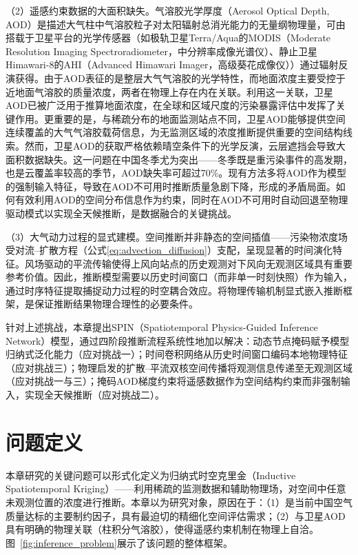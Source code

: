 （2）遥感约束数据的大面积缺失。气溶胶光学厚度（Aerosol Optical Depth, AOD）是描述大气柱中气溶胶粒子对太阳辐射总消光能力的无量纲物理量，可由搭载于卫星平台的光学传感器（如极轨卫星Terra/Aqua的MODIS（Moderate Resolution Imaging Spectroradiometer，中分辨率成像光谱仪）、静止卫星Himawari-8的AHI（Advanced Himawari Imager，高级葵花成像仪））通过辐射反演获得\citep{bessho2016introduction}。由于AOD表征的是整层大气气溶胶的光学特性，而地面\PM 浓度主要受控于近地面气溶胶的质量浓度，两者在物理上存在内在关联\citep{van2016global}。利用这一关联，卫星AOD已被广泛用于推算地面\PM 浓度，在全球和区域尺度的污染暴露评估中发挥了关键作用\citep{geng2021tracking,xiao2017full}。更重要的是，与稀疏分布的地面监测站点不同，卫星AOD能够提供空间连续覆盖的大气气溶胶载荷信息，为无监测区域的\PM 浓度推断提供重要的空间结构线索。然而，卫星AOD的获取严格依赖晴空条件下的光学反演，云层遮挡会导致大面积数据缺失\citep{just2020gradient}。这一问题在中国冬季尤为突出——冬季既是重污染事件的高发期，也是云覆盖率较高的季节，AOD缺失率可超过70\%。现有方法多将AOD作为模型的强制输入特征，导致在AOD不可用时推断质量急剧下降，形成的矛盾局面。如何有效利用AOD的空间分布信息作为约束，同时在AOD不可用时自动回退至物理驱动模式以实现全天候推断，是数据融合的关键挑战。

（3）大气动力过程的显式建模。空间推断并非静态的空间插值——污染物浓度场受对流--扩散方程（公式\eqref{eq:advection_diffusion}）支配，呈现显著的时间演化特征。风场驱动的平流传输使得上风向站点的历史观测对下风向无观测区域具有重要参考价值。因此，推断模型需要以历史时间窗口（而非单一时刻快照）作为输入，通过时序特征提取捕捉动力过程的时空耦合效应。将物理传输机制显式嵌入推断框架，是保证推断结果物理合理性的必要条件。

针对上述挑战，本章提出SPIN（Spatiotemporal Physics-Guided Inference Network）模型，通过四阶段推断流程系统性地加以解决：动态节点掩码赋予模型归纳式泛化能力（应对挑战一）；时间卷积网络从历史时间窗口编码本地物理特征（应对挑战三）；物理启发的扩散--平流双核空间传播将观测信息传递至无观测区域（应对挑战一与三）；掩码AOD梯度约束将遥感数据作为空间结构约束而非强制输入，实现全天候推断（应对挑战二）。


\section{问题定义}
\label{sec:infer_problem}

本章研究的关键问题可以形式化定义为归纳式时空克里金（Inductive Spatiotemporal Kriging）——利用稀疏的监测数据和辅助物理场，对空间中任意未观测位置的\PM 浓度进行推断。本章以\PM 为研究对象，原因在于：（1）\PM 是当前中国空气质量达标的主要制约因子，具有最迫切的精细化空间评估需求；（2）\PM 与卫星AOD具有明确的物理关联（柱积分气溶胶），使得遥感约束机制在物理上自洽。图~\ref{fig:inference_problem}展示了该问题的整体框架。

